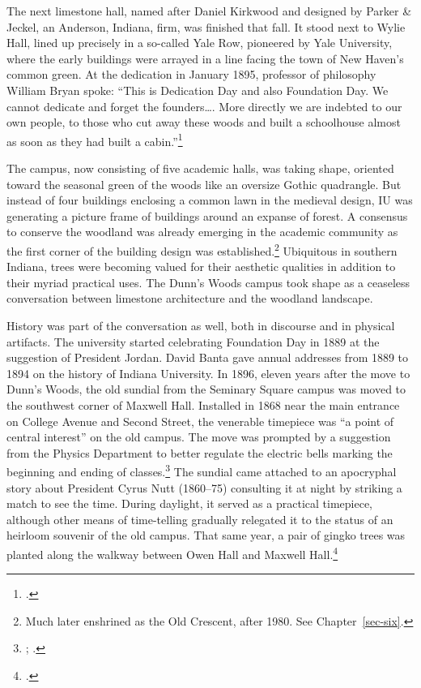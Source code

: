 \documentclass[
  american,
  letterpaper,
]{scrreprt}
\begin{document}
The next limestone hall, named after Daniel Kirkwood and designed by
Parker \& Jeckel, an Anderson, Indiana, firm, was finished that fall. It
stood next to Wylie Hall, lined up precisely in a so-called Yale Row,
pioneered by Yale University, where the early buildings were arrayed in
a line facing the town of New Haven's common green. At the dedication in
January 1895, professor of philosophy William Bryan spoke: ``This is
Dedication Day and also Foundation Day. We cannot dedicate and forget
the founders\ldots. More directly we are indebted to our own people, to
those who cut away these woods and built a schoolhouse almost as soon as
they had built a cabin.''\footnote{.}

The campus, now consisting of five academic halls, was taking shape,
oriented toward the seasonal green of the woods like an oversize Gothic
quadrangle. But instead of four buildings enclosing a common lawn in the
medieval design, IU was generating a picture frame of buildings around
an expanse of forest. A consensus to conserve the woodland was already
emerging in the academic community as the first corner of the building
design was established.\footnote{Much later enshrined as the Old
  Crescent, after 1980. See Chapter~\ref{sec-six}.} Ubiquitous in
southern Indiana, trees were becoming valued for their aesthetic
qualities in addition to their myriad practical uses. The Dunn's Woods
campus took shape as a ceaseless conversation between limestone
architecture and the woodland landscape.

History was part of the conversation as well, both in discourse and in
physical artifacts. The university started celebrating Foundation Day in
1889 at the suggestion of President Jordan. David Banta gave annual
addresses from 1889 to 1894 on the history of Indiana University. In
1896, eleven years after the move to Dunn's Woods, the old sundial from
the Seminary Square campus was moved to the southwest corner of Maxwell
Hall. Installed in 1868 near the main entrance on College Avenue and
Second Street, the venerable timepiece was ``a point of central
interest'' on the old campus. The move was prompted by a suggestion from
the Physics Department to better regulate the electric bells marking the
beginning and ending of classes.\footnote{;
  .} The sundial came attached to an
apocryphal story about President Cyrus Nutt (1860--75) consulting it at
night by striking a match to see the time. During daylight, it served as
a practical timepiece, although other means of time-telling gradually
relegated it to the status of an heirloom souvenir of the old campus.
That same year, a pair of gingko trees was planted along the walkway
between Owen Hall and Maxwell Hall.\footnote{.}
\end{document}
